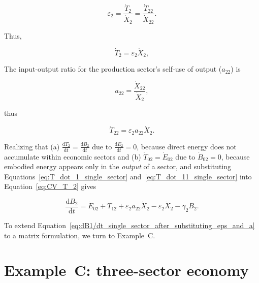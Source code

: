 \begin{equation} \label{eq:single_sector_energy_intensity}
	\varepsilon_{2} 
	= \frac{\dot{T}_{2}}{\dot{X}_{2}} 
	= \frac{\dot{T}_{22}}{\dot{X}_{22}}.
\end{equation}

\noindent{}Thus,

\begin{equation} \label{eq:T_dot_1_single_sector}
	\dot{T}_{2} = \varepsilon_{2}\dot{X}_{2},
\end{equation}

The input-output ratio 
for the production sector's self-use of output ($a_{22}$) is

\begin{equation} \label{eq:io_ratio_single_sector}
	a_{22} = \frac{\dot{X}_{22}}{\dot{X}_{2}},
\end{equation}

\noindent{}thus

\begin{equation} \label{eq:T_dot_11_single_sector}
	\dot{T}_{22} = \varepsilon_{2}a_{22}\dot{X}_{2}.
\end{equation}

Realizing that 
(a) $\frac{\mathrm{d}T_2}{\mathrm{d}t} = \frac{\mathrm{d}B_2}{\mathrm{d}t}$ 
due to $\frac{\mathrm{d}E_2}{\mathrm{d}t} = 0$, because direct energy
does not accumulate within economic sectors and
(b) $\dot{T}_{02} = \dot{E}_{02}$ due to $\dot{B}_{02} = 0$, 
because embodied energy appears only in the \emph{output} of a sector, and
substituting Equations~\ref{eq:T_dot_1_single_sector} 
and~\ref{eq:T_dot_11_single_sector} into Equation~\ref{eq:CV_T_2} gives

\begin{equation} \label{eq:dB1/dt_single_sector_after_substituting_eps_and_a}
	\frac{\mathrm{d}B_{2}}{\mathrm{d}t} 
	= \dot{E}_{02} 
	+ \dot{T}_{12}
	+ \varepsilon_{2}a_{22}\dot{X}_{2} 
	- \varepsilon_{2}\dot{X}_{2} 
	- \gamma_{2}B_{2}.
\end{equation}

To extend Equation~\ref{eq:dB1/dt_single_sector_after_substituting_eps_and_a}
to a matrix formulation, we turn to Example~C.


\section{Example~C: three-sector economy} %
\label{sec:C-intensity}

